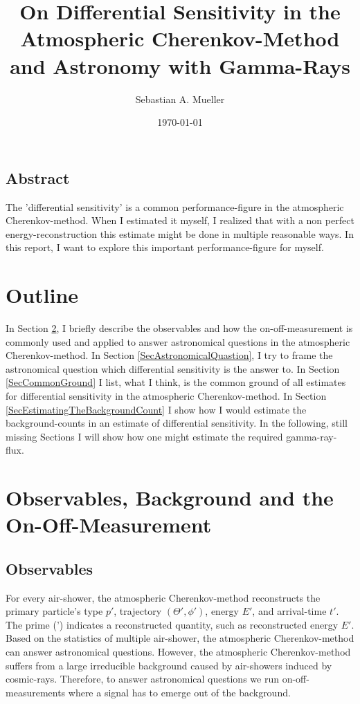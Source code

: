 \documentclass{article}%
\title{
    On Differential Sensitivity in the Atmospheric Cherenkov-Method and Astronomy with Gamma-Rays
}%
\author{Sebastian A. Mueller}%
\date{\today{}}%
\begin{document}
%
\maketitle%
%
\newcommand{\dd}[2]{\frac{\mathrm{d}#1}{\mathrm{d}#2}}
%
\subsection*{Abstract}
The 'differential sensitivity' is a common performance-figure in the atmospheric Cherenkov-method.
%
When I estimated it myself, I realized that with a non perfect energy-reconstruction this estimate might be done in multiple reasonable ways.
%
In this report, I want to explore this important performance-figure for myself.
%
\section{Outline}
%
In Section \ref{SecObservablesAndOnOff}, I briefly describe the observables and how the on-off-measurement is commonly used and applied to answer astronomical questions in the atmospheric Cherenkov-method.
%
In Section \ref{SecAstronomicalQuastion}, I try to frame the astronomical question which differential sensitivity is the answer to.
%
In Section \ref{SecCommonGround} I list, what I think, is the common ground of all estimates for differential sensitivity in the atmospheric Cherenkov-method.
%
In Section \ref{SecEstimatingTheBackgroundCount} I show how I would estimate the background-counts in an estimate of differential sensitivity.
%
In the following, still missing Sections I will show how one might estimate the required gamma-ray-flux.
%
\section{Observables, Background and the On-Off-Measurement}
\label{SecObservablesAndOnOff}
\subsection*{Observables}
%
For every air-shower, the atmospheric Cherenkov-method reconstructs the primary particle's type $p'$, trajectory $(\Theta', \phi')$, energy $E'$, and arrival-time $t'$.
%
The prime (') indicates a reconstructed quantity, such as reconstructed energy $E'$.
%
Based on the statistics of multiple air-shower, the atmospheric Cherenkov-method can answer astronomical questions.
%
However, the atmospheric Cherenkov-method suffers from a large irreducible background caused by air-showers induced by cosmic-rays.
%
Therefore, to answer astronomical questions we run on-off-measurements where a signal has to emerge out of the background.
%
\end{document}
